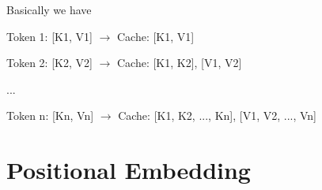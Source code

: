 \documentclass{article}
\begin{document}
Basically we have

Token 1: [K1, V1] $\rightarrow$ Cache: [K1, V1]

Token 2: [K2, V2] $\rightarrow$ Cache: [K1, K2], [V1, V2]

...

Token n: [Kn, Vn] $\rightarrow$ Cache: [K1, K2, ..., Kn], [V1, V2, ..., Vn]


\clearpage
\section{Positional Embedding}

\clearpage
 

\newpage
\appendix
\end{document}
